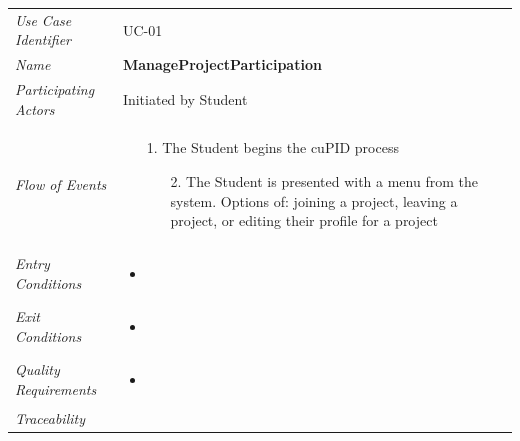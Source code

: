 \documentclass[12pt,letterpaper]{article}
\begin{document}
\begin{center}
	\begin{tabu} to 
		\toprule
		Use Case Identifier & UC-01 \\
		Name & {\bf ManageProjectParticipation} \\
		Participating Actors & Initiated by Student \\

		Flow of Events & 
	    \begin{enumerate}[topsep=-1em]
		    \item[1.] The Student begins the cuPID process
			\begin{enumerate}
				\item[2.] The Student is presented with a menu from the system. Options of: joining a project, leaving a project, or editing their profile for a project
			\end{enumerate}

		\end{enumerate} \\

		Entry Conditions &
		\begin{itemize}[topsep=-1em]
			\item  
        \end{itemize} \\

		Exit Conditions &
		\begin{itemize}[topsep=-1em]
			\item 
        \end{itemize} \\

		Quality Requirements &
		\begin{itemize}[topsep=-1em]
			\item 
        \end{itemize} \\

		Traceability & \\

		\toprule
	\end{tabu}
\end{center}
\end{document}
